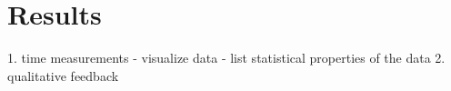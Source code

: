 \chapter{Results}


1. time measurements
  - visualize data
  - list statistical properties of the data
2. qualitative feedback

